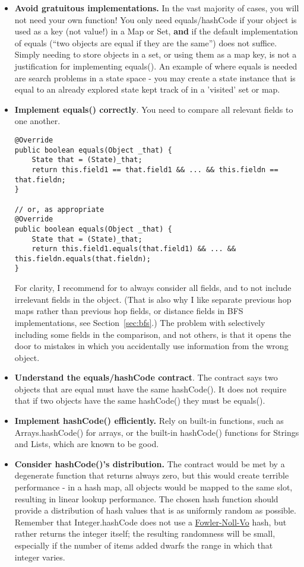 \begin{itemize}
\sloppypar
\item \textbf{Avoid gratuitous implementations.}  In the vast majority of cases,
you will not need your own  function!  You only need equals/hashCode
if your object is used as a key (not value!) in a Map or Set, \textbf{and} if the
default implementation of equals (``two objects are equal if they are the same'') does
not suffice.   Simply needing to store objects in a set, or using them as a map key,
is not a justification for implementing equals().
An example of where equals is needed are search problems in a state space - you may 
create a state instance that is equal to an already explored state kept track of
in a 'visited' set or map.

\item \textbf{Implement equals() correctly}.
You need to compare all relevant fields to one another.
\begin{verbatim}
@Override
public boolean equals(Object _that) {
    State that = (State)_that;
    return this.field1 == that.field1 && ... && this.fieldn == that.fieldn;
}

// or, as appropriate
@Override
public boolean equals(Object _that) {
    State that = (State)_that;
    return this.field1.equals(that.field1) && ... && this.fieldn.equals(that.fieldn);
}
\end{verbatim}
For clarity, I recommend for  to always consider all fields, and 
to not include irrelevant fields in the object.  (That is also why I like separate
previous hop maps rather than previous hop fields, or distance fields in BFS implementations,
see Section~\ref{sec:bfs}.)  The problem with selectively including some fields
in the comparison, and not others, is that it opens the door to mistakes in which
you accidentally use information from the wrong object.

\item \textbf{Understand the equals/hashCode contract}.
The contract says two objects that are equal must have the same hashCode().
It does not require that if two objects have the same hashCode() they must
be equals().  

\item \textbf{Implement hashCode() efficiently.} 
Rely on built-in functions, such as Arrays.hashCode() for arrays, or the built-in
hashCode() functions for Strings and Lists, which are known to be good.

\item \textbf{Consider hashCode()'s distribution.} 
The contract would be met by a degenerate function that returns always zero, but this
would create terrible performance - in a hash map, all objects would be mapped
to the same slot, resulting in linear lookup performance.
The chosen hash function should provide a distribution of hash values
that is as uniformly random as possible. 
Remember that Integer.hashCode does not use a 
\href{http://en.wikipedia.org/wiki/Fowler%E2%80%93Noll%E2%80%93Vo_hash_function}{Fowler-Noll-Vo}
hash, but rather returns the integer itself; the resulting randomness will be
small, especially if the number of items added dwarfs the range in which that integer varies.


\end{itemize}
